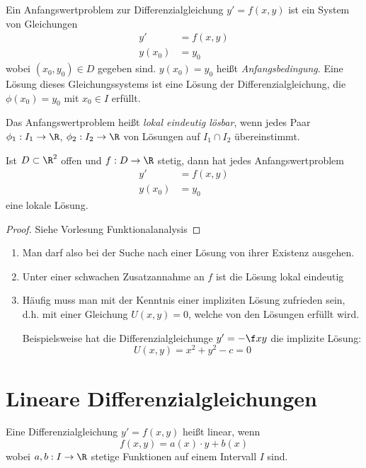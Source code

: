 \documentclass{mycourse}
\begin{document}
Ein Anfangswertproblem zur Differenzialgleichung $y'=f(x,y)$ ist ein System von Gleichungen
\begin{align*}
	y' &= f(x,y)\\
y(x_0) &= y_0
\end{align*}
wobei $(x_0,y_0)\in D$ gegeben sind.
$y(x_0) = y_0$ heißt \emph{Anfangsbedingung}.
Eine Lösung dieses Gleichungssystems ist eine Lösung der Differenzialgleichung, die $\phi(x_0)=y_0$ mit $x_0\in I$ erfüllt.

Das Anfangswertproblem heißt \emph{lokal eindeutig lösbar}, wenn jedes Paar $\phi_1 : I_1 \to \R$, $\phi_2 : I_2 \to \R$ von Lösungen auf $I_1\cap I_2$ übereinstimmt.

\begin{thm}[Peano]
	Ist $D\subset \R^2$ offen und $f:D\to \R$ stetig, dann hat jedes Anfangswertproblem
	\begin{align*}
		y' &= f(x,y)\\
	y(x_0) &= y_0
	\end{align*}
	eine lokale Lösung.
	\begin{proof}
		Siehe Vorlesung Funktionalanalysis
	\end{proof}
	\begin{note}
		\begin{enumerate}[1)]
			\item
				Man darf also bei der Suche nach einer Lösung von ihrer Existenz ausgehen.
			\item
				Unter einer schwachen Zusatzannahme an $f$ ist die Lösung lokal eindeutig
			\item
				Häufig muss man mit der Kenntnis einer impliziten Lösung zufrieden sein, d.h. mit einer Gleichung $U(x,y) = 0$, welche von den Lösungen erfüllt wird.

				Beispielsweise hat die Differenzialgleichunge $y'= - \f xy$ die implizite Lösung:
				\[
					U(x,y) = x^2 + y^2 - c = 0
				\]
		\end{enumerate}
	\end{note}
\end{thm}


\section{Lineare Differenzialgleichungen}

\begin{df*}
	Eine Differenzialgleichung $y' = f(x,y)$ heißt linear, wenn
	\[
		f(x,y) = a(x)\cdot y + b(x)
	\]
	wobei $a,b: I \to \R$ stetige Funktionen auf einem Intervall $I$ sind.
\end{df*}
\end{document}

